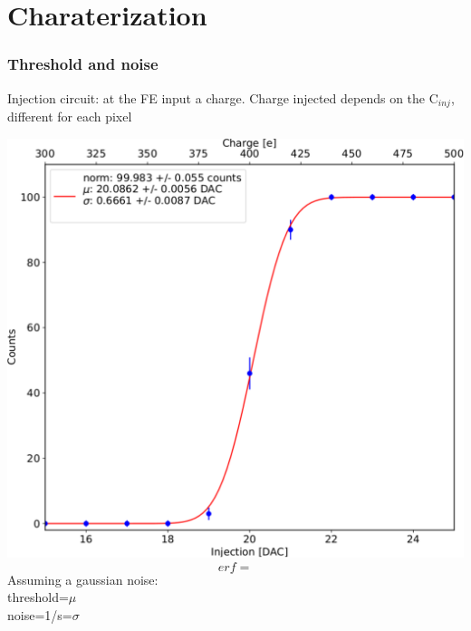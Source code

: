 \section{Charaterization}

    \begin{frame}
        \frametitle{Threshold and noise}
        Injection circuit: at the FE input a charge.
        Charge injected depends on the C$_{inj}$, different for each pixel
        \begin{multicols}{2}
            \includegraphics[width=1.\linewidth]{figures/charaterization/scurve.pdf}
        \columnbreak
            \begin{equation}
                erf=
            \end{equation}	
            Assuming a gaussian noise:\\
            threshold=$\mu$ \\
            noise=1/s=$\sigma$
        \end{multicols} 
 
    \end{frame}


    

